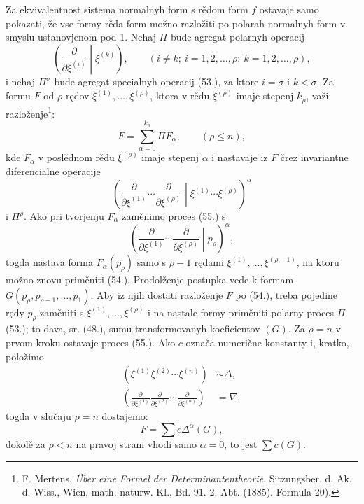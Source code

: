 \documentclass[11pt]{article}
\begin{document}
Za ekvivalentnost sistema normalnyh form s rědom form $f$ ostavaje samo pokazati, že vse formy rěda form možno razložiti po polarah normalnyh form v smyslu ustanovjenom pod 1. Nehaj $\Pi$ bude agregat polarnyh operacij
\begin{equation}
 \left(\frac{\partial}{\partial\xi^{(i)}}\middle|\xi^{(k)}\right),
 \qquad (i\ne k;\ i=1,2,\ldots,\rho;\ k=1,2,\ldots,\rho),
\tag{53}
\end{equation}
i nehaj $\Pi^\sigma$ bude agregat specialnyh operacij (53.), za ktore $i=\sigma$ i $k<\sigma$. Za formu $F$ od $\rho$ rędov $\xi^{(1)},\ldots,\xi^{(\rho)}$, ktora v rědu $\xi^{(\rho)}$ imaje stepenj $k_\rho$, važi razloženje\footnote{F. Mertens, \emph{\"Uber eine Formel der Determinantentheorie}. Sitzungsber. d. Ak. d. Wiss., Wien, math.-naturw. Kl., Bd. 91. 2. Abt. (1885). Formula 20).}:
\begin{equation}
 F=\sum_{\alpha=0}^{k_\rho}\Pi F_\alpha,
 \qquad(\rho\le n),
\tag{54}
\end{equation}
kde $F_\alpha$ v poslědnom rědu $\xi^{(\rho)}$ imaje stepenj $\alpha$ i nastavaje iz $F$ črez invariantne diferencialne operacije
\begin{equation}
 \left(\frac{\partial}{\partial\xi^{(1)}}\cdots\frac{\partial}{\partial\xi^{(\rho)}}\middle|\xi^{(1)}\cdots\xi^{(\rho)}\right)^\alpha
\tag{55}
\end{equation}
i $\Pi^\rho$. Ako pri tvorjenju $F_\alpha$ zaměnimo proces (55.) s
\begin{equation}
 \left(\frac{\partial}{\partial\xi^{(1)}}\cdots\frac{\partial}{\partial\xi^{(\rho)}}\middle|p_\rho\right)^\alpha,
\tag{56}
\end{equation}
togda nastava forma $F_\alpha(p_\rho)$ samo s $\rho-1$ rędami $\xi^{(1)},\ldots,\xi^{(\rho-1)}$, na ktoru možno znovu priměniti (54.). Prodolženje postupka vede k formam $G(p_\rho,p_{\rho-1},\ldots,p_1)$. Aby iz njih dostati razloženje $F$ po (54.), treba pojedine rędy $p_\rho$ zaměniti s $\xi^{(1)},\ldots,\xi^{(\rho)}$ i na nastale formy priměniti polarny proces $\Pi$ (53.); to dava, sr. (48.), sumu transformovanyh koeficientov $(G)$. Za $\rho=n$ v prvom kroku ostavaje proces (55.). Ako $c$ označa numerične konstanty i, kratko, položimo
\begin{equation}
\begin{aligned}
(\xi^{(1)}\xi^{(2)}\cdots\xi^{(n)})&\sim\Delta,\\
\left(\frac{\partial}{\partial\xi^{(1)}}\frac{\partial}{\partial\xi^{(2)}}\cdots\frac{\partial}{\partial\xi^{(n)}}\right)&=\nabla,
\end{aligned}
\tag{57}
\end{equation}
togda v slučaju $\rho=n$ dostajemo:
\begin{equation}
 F=\sum c\Delta^\alpha(G),
\tag{58}
\end{equation}
dokolě za $\rho<n$ na pravoj strani vhodi samo $\alpha=0$, to jest $\sum c(G)$.
\end{document}
